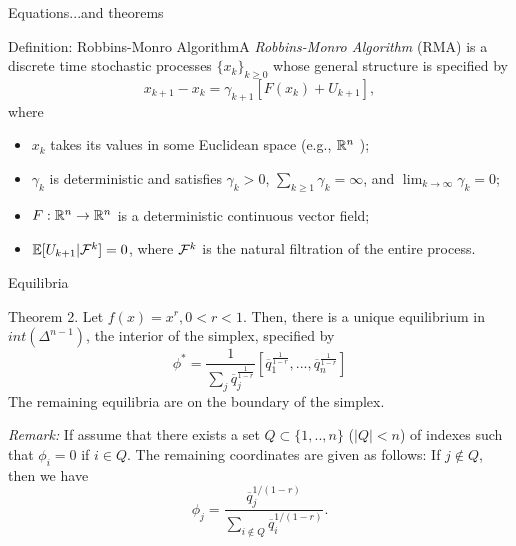 \begin{frame}[c]{Equations}{...and theorems}
\begin{block}{Definition: Robbins-Monro Algorithm}A {\it Robbins-Monro
    Algorithm} (RMA) is a discrete time stochastic processes
  $\{x_k\}_{k \geq 0}$ whose general structure is specified by
\begin{equation}
\label{RMA}
x_{k+1}-x_k=\gamma_{k+1}[F(x_k)+U_{k+1}],
\end{equation}
\noindent	
where
\begin{itemize}
\item $x_k$ takes its values in some Euclidean space (e.g., $\mathbb{R}^n$ );
\item $\gamma_k$ is deterministic and satisfies $\gamma_k>0$,
  $\sum_{k \geq 1}\gamma_k=\infty$, and $\lim_{k \to\infty}\gamma_k=0$;
\item $F:\mathbb{R}^n\to\mathbb{R}^n$ is a deterministic continuous vector field;
\item $\mathbb{E}[U_{k+1}| \mathcal{F}^k]=0$, where $\mathcal{F}^k$ is the natural filtration of
  the entire process.%
\end{itemize}
\end{block}
	
\end{frame}	
	
	
	







\begin{frame}[c]{Equilibria}
\begin{exampleblock}{Theorem 2.} 
\label{eqs}
Let $f(x)=x^r, 0<r<1$. Then, there is a unique equilibrium 
in $int(\Delta^{n-1})$, the interior of the simplex, specified by 
\[
\phi^*=\dfrac{1}{\sum_j
  \overline{q}_j^{\frac{1}{1-r}}}[\overline{q}_1^{\frac{1}{1-r}},...,\overline{q}_n^{\frac{1}{1-r}}]
\]
The remaining equilibria are on the boundary of the simplex.
\end{exampleblock}


\textcolor{anugold}{\textit{Remark:}}
If assume that there exists a set $Q\subset \{1,..,n\}$
($|Q|<n$) of indexes such that $\phi_i=0$ if $i\in Q$. The remaining coordinates are given as follows: If $j \notin
Q$, then we have
\[
\phi_j=\frac{\overline{q}_j^{1/(1-r)}}{\sum_{i\notin Q}\overline{q}_i^{1/(1-r)}}.
\]

%
\end{frame}


